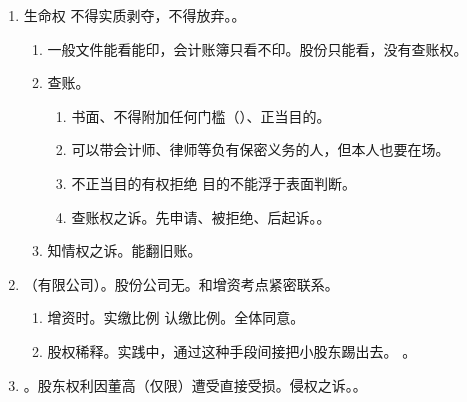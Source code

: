 \begin{enumerate}
\begin{enumerate}
\begin{enumerate}
                  \item 实缴比例 \dy 另有约定要全体同意。。
                  \item 时间。决议载明时间 \dy 章程规定 \dy 做出分红决定 1 年。
                  \item 滥用权力 \yjt 强制分红。
                  \item 分红权之诉。分配方案 + 股东会决议前置。公司为被告。
                        。
                \end{enumerate}
          \item {} \ydy 生命权 \yjt 不得实质剥夺，不得放弃。。
                \begin{enumerate}
                  \item 一般文件能看能印，会计账簿只看不印。股份只能看，没有查账权。
                  \item 查账。
                        \begin{enumerate}
                          \item 书面、不得附加任何门槛（）、正当目的。
                          \item 可以带会计师、律师等负有保密义务的人，但本人也要在场。
                          \item 不正当目的有权拒绝 \yjt 目的不能浮于表面判断。
                          \item 查账权之诉。先申请、被拒绝、后起诉。。
                        \end{enumerate}
                  \item 知情权之诉。能翻旧账。
                \end{enumerate}
          \item （有限公司）。股份公司无。和增资考点紧密联系。
                \begin{enumerate}
                  \item 增资时。实缴比例 \dy 认缴比例。全体同意。
                  \item 股权稀释。实践中，通过这种手段间接把小股东踢出去。
                        。
                \end{enumerate}
          \item {}。股东权利因董高（仅限）遭受直接受损。侵权之诉。。

\end{enumerate}
\end{enumerate}
